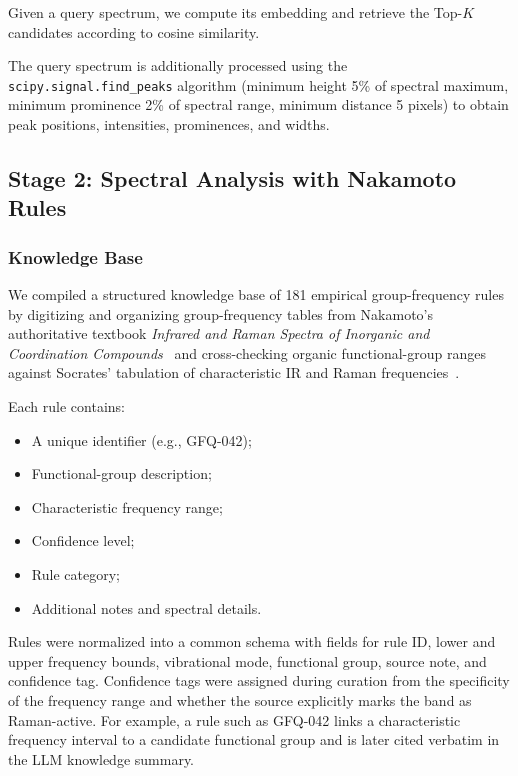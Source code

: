 \documentclass[conference]{IEEEtran}
\begin{document}
Given a query spectrum, we compute its embedding and retrieve the Top-$K$ candidates according to cosine similarity.

The query spectrum is additionally processed using the \texttt{scipy.signal.find\_peaks} algorithm (minimum height 5\% of spectral maximum, minimum prominence 2\% of spectral range, minimum distance 5 pixels) to obtain peak positions, intensities, prominences, and widths.

\subsection{Stage 2: Spectral Analysis with Nakamoto Rules}

\subsubsection{Knowledge Base}

We compiled a structured knowledge base of 181 empirical group-frequency rules by digitizing and organizing group-frequency tables from Nakamoto's authoritative textbook \textit{Infrared and Raman Spectra of Inorganic and Coordination Compounds}~\cite{nakamoto2008infrared} and cross-checking organic functional-group ranges against Socrates' tabulation of characteristic IR and Raman frequencies~\cite{socrates2004infrared}.

Each rule contains:

\begin{itemize}
    \item A unique identifier (e.g., GFQ-042);
    \item Functional-group description;
    \item Characteristic frequency range;
    \item Confidence level;
    \item Rule category;
    \item Additional notes and spectral details.
\end{itemize}

Rules were normalized into a common schema with fields for rule ID, lower and upper frequency bounds, vibrational mode, functional group, source note, and confidence tag. Confidence tags were assigned during curation from the specificity of the frequency range and whether the source explicitly marks the band as Raman-active. For example, a rule such as GFQ-042 links a characteristic frequency interval to a candidate functional group and is later cited verbatim in the LLM knowledge summary.
\end{document}
